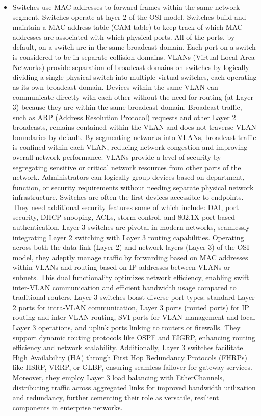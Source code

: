 \documentclass{article}
\begin{document}
\begin{itemize}
	\item[] Switches use MAC addresses to forward frames within the same network segment. Switches operate at layer 2 of the OSI model. Switches build and maintain a MAC address table (CAM table) to keep track of which MAC addresses are associated with which physical ports. All of the ports, by default, on a switch are in the same broadcast domain. Each port on a switch is considered to be in separate collision domains. VLANs (Virtual Local Area Networks) provide separation of broadcast domains on switches by logically dividing a single physical switch into multiple virtual switches, each operating as its own broadcast domain. Devices within the same VLAN can communicate directly with each other without the need for routing (at Layer 3) because they are within the same broadcast domain. Broadcast traffic, such as ARP (Address Resolution Protocol) requests and other Layer 2 broadcasts, remains contained within the VLAN and does not traverse VLAN boundaries by default. By segmenting networks into VLANs, broadcast traffic is confined within each VLAN, reducing network congestion and improving overall network performance. VLANs provide a level of security by segregating sensitive or critical network resources from other parts of the network. Administrators can logically group devices based on department, function, or security requirements without needing separate physical network infrastructure. Switches are often the first devices accessible to endpoints. They need additional security features some of which include: DAI, port security, DHCP snooping, ACLs, storm control, and 802.1X port-based authentication. Layer 3 switches are pivotal in modern networks, seamlessly integrating Layer 2 switching with Layer 3 routing capabilities. Operating across both the data link (Layer 2) and network layers (Layer 3) of the OSI model, they adeptly manage traffic by forwarding based on MAC addresses within VLANs and routing based on IP addresses between VLANs or subnets. This dual functionality optimizes network efficiency, enabling swift inter-VLAN communication and efficient bandwidth usage compared to traditional routers. Layer 3 switches boast diverse port types: standard Layer 2 ports for intra-VLAN communication, Layer 3 ports (routed ports) for IP routing and inter-VLAN routing, SVI ports for VLAN management and local Layer 3 operations, and uplink ports linking to routers or firewalls. They support dynamic routing protocols like OSPF and EIGRP, enhancing routing efficiency and network scalability. Additionally, Layer 3 switches facilitate High Availability (HA) through First Hop Redundancy Protocols (FHRPs) like HSRP, VRRP, or GLBP, ensuring seamless failover for gateway services. Moreover, they employ Layer 3 load balancing with EtherChannels, distributing traffic across aggregated links for improved bandwidth utilization and redundancy, further cementing their role as versatile, resilient components in enterprise networks.

\end{itemize}
\end{document}
